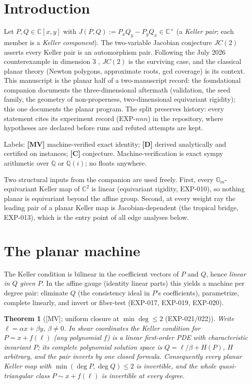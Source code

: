 \documentclass[11pt]{article}
\newtheorem{theorem}{Theorem}[section]
\theoremstyle{remark}
\newcommand{\C}{\mathbb{C}}
\newcommand{\Q}{\mathbb{Q}}
\newcommand{\Gm}{\mathbb{G}_m}
\begin{document}
\section{Introduction}

Let $P, Q \in \C[x, y]$ with $J(P, Q) := P_x Q_y - P_y Q_x \in \C^\times$ (a \emph{Keller
pair}; each member is a \emph{Keller component}). The two-variable Jacobian conjecture $JC(2)$
asserts every Keller pair is an automorphism pair. Following the July 2026 counterexample in
dimension 3 \cite{Alpoge2026}, $JC(2)$ is the surviving case, and the classical planar theory
(Newton polygons, approximate roots, gcd coverage) is its context. This manuscript is the
planar half of a two-manuscript record: the foundational companion documents the
three-dimensional aftermath (validation, the seed family, the geometry of non-properness,
two-dimensional equivariant rigidity); this one documents the planar program. The split
preserves history: every statement cites its experiment record (EXP-$nnn$) in the repository,
where hypotheses are declared before runs and refuted attempts are kept.

Labels: \textbf{[MV]} machine-verified exact identity; \textbf{[D]} derived analytically and
certified on instances; \textbf{[C]} conjecture. Machine-verification is exact sympy
arithmetic over $\Q$ or $\Q(i)$; no floats anywhere.

Two structural inputs from the companion are used freely. First, every $\Gm$-equivariant
Keller map of $\C^2$ is linear (equivariant rigidity, EXP-010), so nothing planar is
equivariant beyond the affine group. Second, at every weight ray the leading pair of a planar
Keller map is Jacobian-dependent (the tropical bridge, EXP-013), which is the entry point of
all edge analyses below.

\section{The planar machine}

The Keller condition is bilinear in the coefficient vectors of $P$ and $Q$, hence
\emph{linear in $Q$ given $P$}. In the affine gauge (identity linear parts) this yields a
machine per degree pair: eliminate $Q$ (the consistency ideal in $P$'s coefficients),
parametrize, complete linearly, and invert or fiber-test (EXP-017, EXP-019, EXP-020).

\begin{theorem}[{[MV]}; uniform closure at $\min\deg \le 2$ (EXP-021/022)]\label{thm:uniform}
Write $\ell = \alpha x + \beta y$, $\beta \ne 0$. In shear coordinates the Keller condition
for $P = x + f(\ell)$ (any polynomial $f$) is a linear first-order PDE with characteristic
invariant $P$; its complete polynomial solution space is $Q = \ell/\beta + H(P)$, $H$
arbitrary, and the pair inverts by one closed formula. Consequently every planar Keller map
with $\min(\deg P, \deg Q) \le 2$ is invertible, and the whole quasi-triangular class
$P \sim x + f(\ell)$ is invertible at every degree.
\end{theorem}
\end{document}
